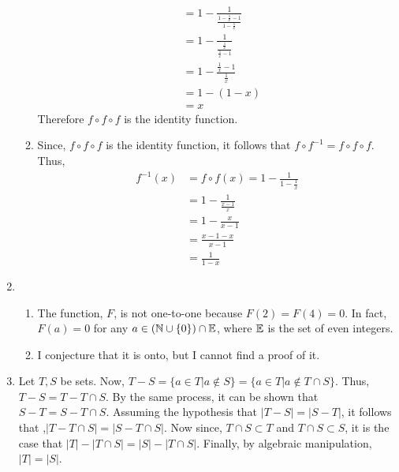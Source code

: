 \documentclass[12pt]{article}
\begin{document}
\begin{enumerate}
\begin{enumerate}
\begin{equation*}
\begin{split}
                &= 1- \frac{1}{\frac{1-\frac{1}{x}-1}{1-\frac{1}{x}}}\\
                &= 1 - \frac{1}{\frac{\frac{1}{x}}{\frac{1}{x}-1}}\\
                &= 1 - \frac{\frac{1}{x}-1}{\frac{1}{x}}\\
                &= 1 - (1-x)\\
                &=x
            \end{split}
        \end{equation*}
        Therefore \(f\circ f\circ f\) is the identity function.
        \item Since, \(f \circ f \circ f\) is the identity function, it follows that \(f\circ f^{-1} = f \circ f \circ f\). Thus, \begin{equation*}
            \begin{split}
                f^{-1}(x) &= f \circ f(x) = 1 - \frac{1}{1-\frac{1}{x}}\\
                &= 1 - \frac{1}{\frac{x-1}{x}}\\
                &= 1 - \frac{x}{x-1}\\
                &= \frac{x-1-x}{x-1}\\
                &= \frac{1}{1-x}
            \end{split}
        \end{equation*}
    \end{enumerate}
    \item \begin{enumerate}
        \item The function, \(F\), is not one-to-one because \(F(2)=F(4)=0\). In fact, \(F(a)=0\) for any \(a\in(\mathbb{N}\cup\{0\})\cap\mathbb{E}\), where \(\mathbb{E}\) is the set of even integers.
        \item I conjecture that it is onto, but I cannot find a proof of it. 
    \end{enumerate}
    \item Let \(T,S\) be sets. Now, \(T-S = \{a\in T| a\not\in S\} = \{a\in T| a\not \in T\cap S\}\). Thus, \(T-S = T - T\cap S\). By the same process, it can be shown that \(S - T = S - T\cap S\). Assuming the hypothesis that \(|T-S| = |S-T|\), it follows that ,\(|T - T\cap S| = |S - T\cap S|\). Now since, \(T\cap S \subset T\) and \(T\cap S\subset S\), it is the case that \(|T|-|T\cap S| = |S| - |T\cap S|\). Finally, by algebraic manipulation, \(|T|=|S|\). 
\end{enumerate}
\end{document}
